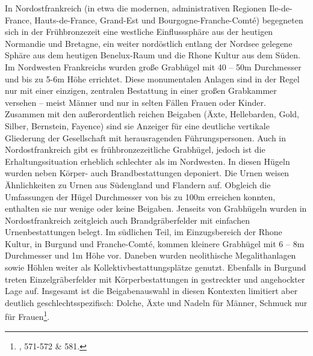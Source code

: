 \documentclass[openany,twoside,twocolumn]{book}
\let\rmarkdownfootnote\footnote%
\def\footnote{\protect\rmarkdownfootnote}
\begin{document}
In Nordostfrankreich (in etwa die modernen, administrativen Regionen
Ile-de-France, Hauts-de-France, Grand-Est und Bourgogne-Franche-Comté)
begegneten sich in der Frühbronzezeit eine westliche Einflusssphäre aus
der heutigen Normandie und Bretagne, ein weiter nordöstlich entlang der
Nordsee gelegene Sphäre aus dem heutigen Benelux-Raum und die Rhone
Kultur aus dem Süden. Im Nordwesten Frankreichs wurden große Grabhügel
mit 40 -- 50m Durchmesser und bis zu 5-6m Höhe errichtet. Diese
monumentalen Anlagen sind in der Regel nur mit einer einzigen, zentralen
Bestattung in einer großen Grabkammer versehen -- meist Männer und nur
in selten Fällen Frauen oder Kinder. Zusammen mit den außerordentlich
reichen Beigaben (Äxte, Hellebarden, Gold, Silber, Bernstein, Fayence)
sind sie Anzeiger für eine deutliche vertikale Gliederung der
Gesellschaft mit herausragenden Führungspersonen. Auch in
Nordostfrankreich gibt es frühbronzezeitliche Grabhügel, jedoch ist die
Erhaltungssituation erheblich schlechter als im Nordwesten. In diesen
Hügeln wurden neben Körper- auch Brandbestattungen deponiert. Die Urnen
weisen Ähnlichkeiten zu Urnen aus Südengland und Flandern auf. Obgleich
die Umfassungen der Hügel Durchmesser von bis zu 100m erreichen konnten,
enthalten sie nur wenige oder keine Beigaben. Jenseits von Grabhügeln
wurden in Nordostfrankreich zeitgleich auch Brandgräberfelder mit
einfachen Urnenbestattungen belegt. Im südlichen Teil, im Einzugsbereich
der Rhone Kultur, in Burgund und Franche-Comté, kommen kleinere
Grabhügel mit 6 -- 8m Durchmesser und 1m Höhe vor. Daneben wurden
neolithische Megalithanlagen sowie Höhlen weiter als
Kollektivbestattungsplätze genutzt. Ebenfalls in Burgund treten
Einzelgräberfelder mit Körperbestattungen in gestreckter und angehockter
Lage auf. Insgesamt ist die Beigabenauswahl in diesen Kontexten
limitiert aber deutlich geschlechtsspezifisch: Dolche, Äxte und Nadeln
für Männer, Schmuck nur für Frauen\footnote{\textcite{mordant_bronze_2013},
  571-572 \& 581.}.
\end{document}
